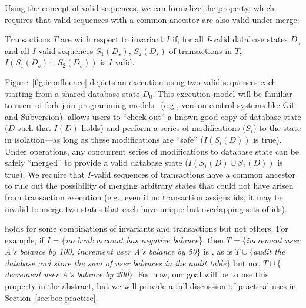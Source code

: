Using the concept of valid sequences, we can formalize the
\iconfluence property, which requires that valid sequences with a
common ancestor are also valid under merge:

\begin{definition}[\iconfluence]
Transactions $T$ are \iconfluent with respect to invariant $I$ if, for
all $I$-valid database states $D_s$ and all $I$-valid sequences
$S_1(D_s)$, $S_2(D_s)$ of transactions in $T$, $I(S_1(D_s) \sqcup
S_2(D_s))$ is $I$-valid.
\end{definition}

Figure~\ref{fig:iconfluence} depicts an \iconfluent execution using
two valid sequences each starting from a shared database state
$D_0$. This execution model will be familiar to users of fork-join
programming models~\cite{hewitt-forkjoin} (e.g., version control
systems like Git and Subversion). \iconfluence allows users to ``check
out'' a known good copy of database state ($D$ such that $I(D)$ holds)
and perform a series of modifications ($S_i$) to the state in
isolation---as long as these modifications are ``safe'' ($I(S_i(D))$
is true). Under \iconfluent operations, any concurrent series of
modifications to database state can be safely ``merged'' to provide a
valid database state ($I(S_1(D) \cup S_2(D))$ is true). We require
that $I$-valid sequences of transactions have a common ancestor to
rule out the possibility of merging arbitrary states that could not
have arisen from transaction execution (e.g., even if no transaction
assigns ids, it may be invalid to merge two states that each have
unique but overlapping sets of ids).

\iconfluence holds for some combinations of invariants and
transactions but not others. For example, if $I=\{$\textit{no bank
  account has negative balance}$\}$, then $T=\{$\textit{increment user
  A's balance by 100, increment user A's balance by 50}$\}$ is
\iconfluent, as is $T\cup\{$\textit{audit the database and store the
  sum of user balances in the \textrm{audit} table}$\}$ but not
$T\cup\{$\textit{decrement user A's balance by 200}$\}$. For now, our
goal will be to use this property in the abstract, but we will provide
a full discussion of practical uses in Section~\ref{sec:bcc-practice}.

